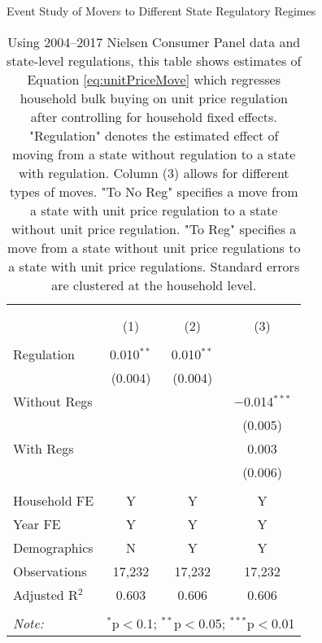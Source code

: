 \begin{table}[!htbp] \centering
  \caption{Event Study of Movers to Different State Regulatory Regimes}
  \label{tab:unitPriceLawMovers}
\begin{tabular}{@{\extracolsep{5pt}}lccc}
\\[-1.8ex]\hline
\hline \\[-1.8ex]
\\[-1.8ex] & (1) & (2) & (3)\\
\hline \\[-1.8ex]
 Regulation & 0.010$^{**}$ & 0.010$^{**}$ &  \\
  & (0.004) & (0.004) &  \\
  Without Regs &  &  & $-$0.014$^{***}$ \\
  &  &  & (0.005) \\
  With Regs &  &  & 0.003 \\
  &  &  & (0.006) \\
 \hline \\[-1.8ex]
Household FE & Y & Y & Y \\
Year FE & Y & Y & Y \\
Demographics & N & Y & Y \\
Observations & 17,232 & 17,232 & 17,232 \\
Adjusted R$^{2}$ & 0.603 & 0.606 & 0.606 \\
\hline
\hline \\[-1.8ex]
\textit{Note:}  & \multicolumn{3}{l}{$^{*}$p$<$0.1; $^{**}$p$<$0.05; $^{***}$p$<$0.01} \\
\end{tabular}
\caption*{Using 2004--2017 Nielsen Consumer Panel data and state-level regulations, this table shows estimates of Equation \ref{eq:unitPriceMove} which regresses household bulk buying on unit price regulation after controlling for household fixed effects. "Regulation" denotes the estimated effect of moving from a state without regulation to a state with regulation. Column (3) allows for different types of moves. "To No Reg" specifies a move from a state with unit price regulation to a state without unit price regulation. "To Reg" specifies a move from a state without unit price regulations to a state with unit price regulations. Standard errors are clustered at the household level.}
\end{table}
